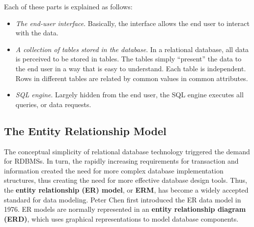 \documentclass[a4paper, 12pt, titlepage]{report}
\begin{document}
Each of these parts is explained as follows:
\begin{itemize}
\item \emph{The end-user interface}. Basically, the interface allows the end user to interact with the data.
\item \emph{A collection of tables stored in the database}. In a relational database, all data is perceived to be stored in tables. The tables simply “present” the data to the end user in a way that is easy to understand. Each table is independent. Rows in different tables are related by common values in common attributes.
\item \emph{SQL engine}. Largely hidden from the end user, the SQL engine executes all queries, or data requests.
\end{itemize}
\subsection{The Entity Relationship Model}
The conceptual simplicity of relational database technology triggered the demand for RDBMSs. In turn, the rapidly increasing requirements for transaction and information created the need for more complex database implementation structures, thus creating the need for more effective database design tools. Thus, the \textbf{entity relationship (ER) model}, or \textbf{ERM}, has become a widely accepted standard for data modeling. Peter Chen first introduced the ER data model in 1976. ER models are normally represented in an \textbf{entity relationship diagram (ERD)}, which uses graphical representations to model database components.
\end{document}
